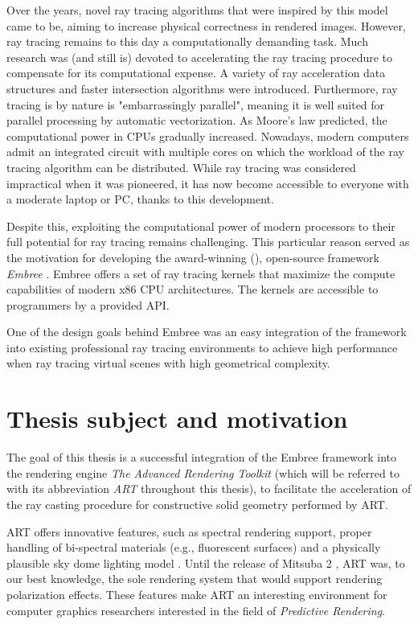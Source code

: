 Over the years, novel ray tracing algorithms that were inspired by this model came to be, aiming to increase physical correctness in rendered images. However, ray tracing remains to this day a computationally demanding task. Much research was (and still is) devoted to accelerating the ray tracing procedure to compensate for its computational expense. A variety of ray acceleration data structures and faster intersection algorithms were introduced. Furthermore, ray tracing is by nature is "embarrassingly parallel", meaning it is well suited for parallel processing by automatic vectorization. As Moore’s law predicted, the computational power in CPUs gradually increased. Nowadays, modern computers admit an integrated circuit with multiple cores on which the workload of the ray tracing algorithm can be distributed. While ray tracing was considered impractical when it was pioneered, it has now become accessible to everyone with a moderate laptop or PC, thanks to this development.

Despite this, exploiting the computational power of modern processors to their full potential for ray tracing remains challenging. This particular reason served as the motivation for developing the award-winning (\cite{embreeAward}), open-source framework \emph{Embree} \cite{wald2014embree}. Embree offers a set of ray tracing kernels that maximize the compute capabilities of modern x86 CPU architectures. The kernels are accessible to programmers by a provided API. 

One of the design goals behind Embree was an easy integration of the framework into existing professional ray tracing environments to achieve high performance when ray tracing virtual scenes with high geometrical complexity.


\section*{Thesis subject and motivation}
The goal of this thesis is a successful integration of the Embree framework into the rendering engine \emph{The Advanced Rendering Toolkit} \cite{artSoftware} (which will be referred to with its abbreviation \emph{ART} throughout this thesis), to facilitate the acceleration of the ray casting procedure for constructive solid geometry performed by ART. 

ART offers innovative features, such as spectral rendering support, proper handling of bi-spectral materials (e.g., fluorescent surfaces) \cite{mojzik2018handling} and a physically plausible sky dome lighting model \cite{wilkie2013predicting}. Until the release of Mitsuba 2 \cite{nimier2019mitsuba}, ART was, to our best knowledge, the sole rendering system that would support rendering polarization effects. These features make ART an interesting environment for computer graphics researchers interested in the field of \emph{Predictive Rendering}.

